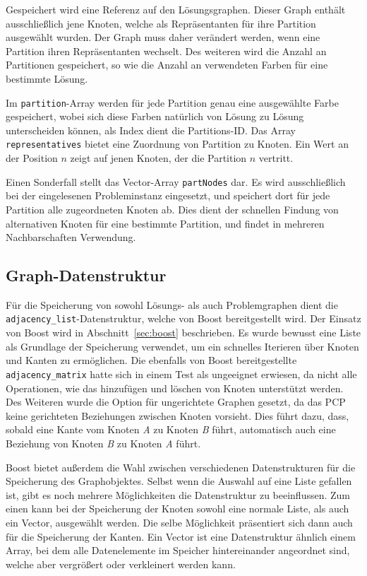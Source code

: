 Gespeichert wird eine Referenz auf den Lösungsgraphen. Dieser Graph enthält ausschließlich jene Knoten, welche als Repräsentanten für ihre Partition
ausgewählt wurden. Der Graph muss daher verändert werden, wenn eine Partition ihren Repräsentanten wechselt. Des weiteren wird die Anzahl an Partitionen
gespeichert, so wie die Anzahl an verwendeten Farben für eine bestimmte Lösung. 

Im \texttt{partition}-Array werden für jede Partition genau eine ausgewählte Farbe gespeichert, wobei sich diese Farben natürlich von Lösung zu Lösung 
unterscheiden können, als Index dient die Partitions-ID. Das Array \texttt{representatives} bietet eine Zuordnung von Partition zu Knoten. Ein Wert 
an der Position $n$ zeigt auf jenen Knoten, der die Partition $n$ vertritt.

Einen Sonderfall stellt das Vector-Array \texttt{partNodes} dar. Es wird ausschließlich bei der eingelesenen Probleminstanz eingesetzt, und speichert
dort für jede Partition alle zugeordneten Knoten ab. Dies dient der schnellen Findung von alternativen Knoten für eine bestimmte Partition, und findet
in mehreren Nachbarschaften Verwendung. 

\subsection{Graph-Datenstruktur}
Für die Speicherung von sowohl Lösungs- als auch Problemgraphen dient die \texttt{adjacency\_list}-Datenstruktur, welche von Boost bereitgestellt wird. Der Einsatz von Boost wird in Abschnitt~\ref{sec:boost} 
beschrieben. Es wurde bewusst eine Liste als Grundlage der Speicherung verwendet, um ein schnelles Iterieren über Knoten und Kanten zu ermöglichen. Die ebenfalls von Boost bereitgestellte 
\texttt{adjacency\_matrix} hatte sich in einem Test als ungeeignet erwiesen, da nicht alle Operationen, wie das hinzufügen und löschen von Knoten unterstützt werden. Des Weiteren wurde die Option für 
ungerichtete Graphen gesetzt, da das PCP keine gerichteten Beziehungen zwischen Knoten vorsieht. Dies führt dazu, dass, sobald eine Kante vom Knoten \textit{A} zu Knoten \textit{B} führt, automatisch auch
eine Beziehung von Knoten \textit{B} zu Knoten \textit{A} führt.

Boost bietet außerdem die Wahl zwischen verschiedenen Datenstrukturen für die Speicherung des Graphobjektes. Selbst wenn die Auswahl auf eine Liste gefallen ist, gibt es noch mehrere Möglichkeiten die Datenstruktur
zu beeinflussen. Zum einen kann bei der Speicherung der Knoten sowohl eine normale Liste, als auch ein Vector, ausgewählt werden. Die selbe Möglichkeit präsentiert sich dann auch für die Speicherung der Kanten.
Ein Vector ist eine Datenstruktur ähnlich einem Array, bei dem alle Datenelemente im Speicher hintereinander angeordnet sind, welche aber vergrößert oder verkleinert werden kann.

